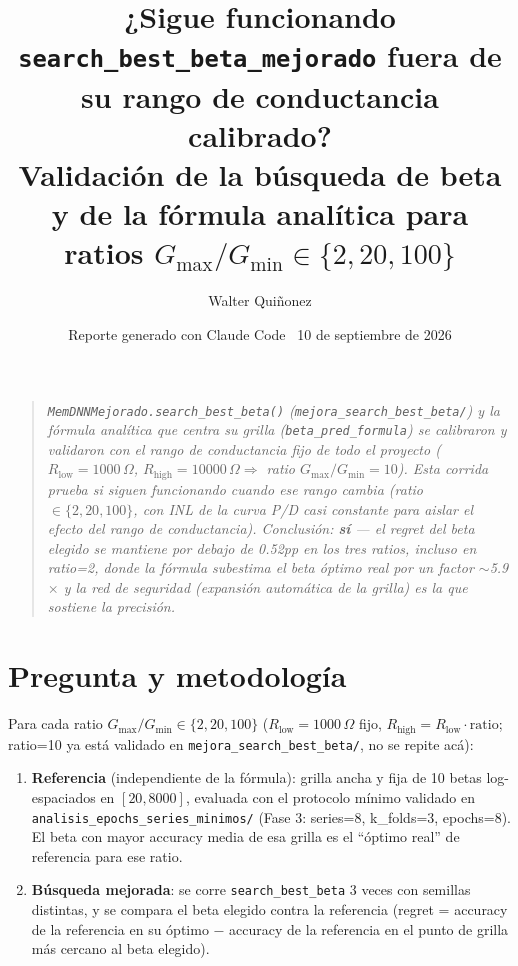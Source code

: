 \documentclass[11pt]{article}
\title{\textbf{¿Sigue funcionando \texttt{search\_best\_beta\_mejorado} fuera de su rango de conductancia calibrado?}\\
\large Validación de la búsqueda de beta y de la fórmula analítica para ratios $G_{\max}/G_{\min}\in\{2,20,100\}$}
\author{Walter Quiñonez}
\date{Reporte generado con Claude Code \textperiodcentered\ 10 de septiembre de 2026}
\begin{document}
\maketitle

\begin{quote}\itshape
\texttt{MemDNNMejorado.search\_best\_beta()} (\texttt{mejora\_search\_best\_beta/}) y la fórmula
analítica que centra su grilla (\texttt{beta\_pred\_formula}) se calibraron y validaron con el
rango de conductancia fijo de todo el proyecto ($R_{\text{low}}=1000\,\Omega$,
$R_{\text{high}}=10000\,\Omega \Rightarrow$ ratio $G_{\max}/G_{\min}=10$). Esta corrida prueba
si siguen funcionando cuando ese rango cambia (ratio $\in\{2,20,100\}$, con INL de la curva
P/D casi constante para aislar el efecto del rango de conductancia). Conclusión: \textbf{sí}
--- el regret del beta elegido se mantiene por debajo de 0.52pp en los tres ratios, incluso en
ratio=2, donde la fórmula subestima el beta óptimo real por un factor $\sim$5.9$\times$ y la
red de seguridad (expansión automática de la grilla) es la que sostiene la precisión.
\end{quote}

\tableofcontents

\section{Pregunta y metodología}

Para cada ratio $G_{\max}/G_{\min}\in\{2,20,100\}$ ($R_{\text{low}}=1000\,\Omega$ fijo,
$R_{\text{high}}=R_{\text{low}}\cdot\text{ratio}$; ratio=10 ya está validado en
\texttt{mejora\_search\_best\_beta/}, no se repite acá):

\begin{enumerate}
\item \textbf{Referencia} (independiente de la fórmula): grilla ancha y fija de 10 betas
log-espaciados en $[20,8000]$, evaluada con el protocolo mínimo validado en
\texttt{analisis\_epochs\_series\_minimos/} (Fase 3: series=8, k\_folds=3, epochs=8). El beta
con mayor accuracy media de esa grilla es el ``óptimo real'' de referencia para ese ratio.
\item \textbf{Búsqueda mejorada}: se corre \texttt{search\_best\_beta} 3 veces con semillas
distintas, y se compara el beta elegido contra la referencia (regret = accuracy de la
referencia en su óptimo $-$ accuracy de la referencia en el punto de grilla más cercano al beta
elegido).
\end{enumerate}
\end{document}

